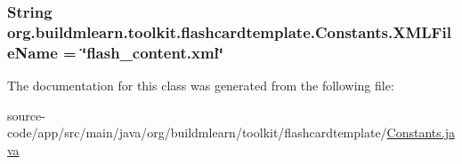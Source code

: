 \subsubsection[{\texorpdfstring{X\+M\+L\+File\+Name}{XMLFileName}}]{\setlength{\rightskip}{0pt plus 5cm}String org.\+buildmlearn.\+toolkit.\+flashcardtemplate.\+Constants.\+X\+M\+L\+File\+Name = \char`\"{}flash\+\_\+content.\+xml\char`\"{}\hspace{0.3cm}{\ttfamily [static]}}\hypertarget{classorg_1_1buildmlearn_1_1toolkit_1_1flashcardtemplate_1_1Constants_a44b1cfc324107db29d9c469400c4619f}{}\label{classorg_1_1buildmlearn_1_1toolkit_1_1flashcardtemplate_1_1Constants_a44b1cfc324107db29d9c469400c4619f}


The documentation for this class was generated from the following file\+:\begin{DoxyCompactItemize}
\item 
source-\/code/app/src/main/java/org/buildmlearn/toolkit/flashcardtemplate/\hyperlink{flashcardtemplate_2Constants_8java}{Constants.\+java}\end{DoxyCompactItemize}
